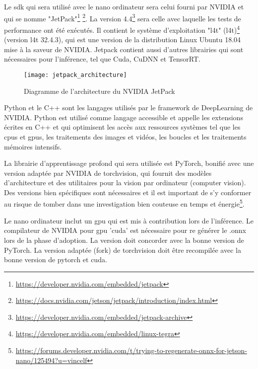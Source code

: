 \par Le \acrshort{sdk} qui sera utilisé avec le nano ordinateur sera celui fourni par NVIDIA et qui se nomme "JetPack"\footnote{\url{https://developer.nvidia.com/embedded/jetpack}} \footnote{\url{https://docs.nvidia.com/jetson/jetpack/introduction/index.html}}. La version 4.4\footnote{\url{https://developer.nvidia.com/embedded/jetpack-archive}} sera celle avec laquelle les tests de performance ont été exécutés. Il contient le système d'exploitation "\acrlong{l4t}" (\acrshort{l4t})\footnote{\url{https://developer.nvidia.com/embedded/linux-tegra}} (version \acrshort{l4t} 32.4.3), qui est une version de la distribution Linux Ubuntu 18.04 mise à la saveur de NVIDIA. Jetpack contient aussi d'autres librairies qui sont nécessaires pour l'inférence, tel que Cuda, CuDNN et TensorRT.
\begin{figure}[H]
    \centering
    \texttt{[image: jetpack\_architecture]}
    \caption[Diagramme de l'architecture du NVIDIA JetPack]{Diagramme de l'architecture du NVIDIA JetPack\protect\footnotemark}
    \label{fig:jetpack_architecture}
\end{figure}
\par Python et le C++ sont les langages utilisés par le framework de DeepLearning de NVIDIA. Python est utilisé comme langage accessible et appelle les extensions écrites en C++ et qui optimisent les accès aux ressources systèmes tel que les \acrshort{cpu}s et \acrshort{gpu}s, les traitements des images et vidéos, les boucles et les traitements mémoires intensifs.
\par La librairie d’apprentissage profond qui sera utilisée est PyTorch, bonifié avec une version adaptée par NVIDIA de torchvision, qui fournit des modèles d'architecture et des utilitaires pour la vision par ordinateur (computer vision). Des versions bien spécifiques sont nécessaires et il est important de s'y conformer au risque de tomber dans une investigation bien couteuse en temps et énergie\footnote{\url{https://forums.developer.nvidia.com/t/trying-to-regenerate-onnx-for-jetson-nano/125494?u=vincelf}}.
\par Le nano ordinateur inclut un \acrshort{gpu} qui est mis à contribution lors de l'inférence. Le compilateur de NVIDIA pour \acrshort{gpu} 'cuda' est nécessaire pour re générer le .onnx lors de la phase d'adoption. La version doit concorder avec la bonne version de PyTorch. La version adaptée (fork) de torchvision doit être recompilée avec la bonne version de pytorch et cuda. 
